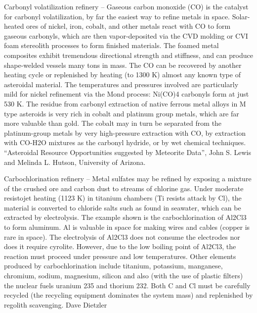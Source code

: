 \documentclass[a4paper]{book}
\begin{document}
Carbonyl volatilization refinery – Gaseous carbon monoxide (CO) is the catalyst for carbonyl volatilization, by far the easiest way to refine metals in space. Solar-heated ores of nickel, iron, cobalt, and other metals react with CO to form gaseous carbonyls, which are then vapor-deposited via the CVD molding or CVI foam stereolith processes to form finished materials. The foamed metal composites exhibit tremendous directional strength and stiffness, and can produce shape-welded vessels many tons in mass.  The CO can be recovered by another heating cycle or replenished by heating (to 1300 K) almost any known type of asteroidal material.  The temperatures and pressures involved are particularly mild for nickel refinement via the Mond process: Ni(CO)4 carbonyls form at just 530 K. The residue from carbonyl extraction of native ferrous metal alloys in M type asteroids is very rich in cobalt and platinum group metals, which are far more valuable than gold. The cobalt may in turn be separated from the platinum-group metals by very high-pressure extraction with CO, by extraction with CO-H2O mixtures as the carbonyl hydride, or by wet chemical techniques.   “Asteroidal Resource Opportunities suggested by Meteorite Data”,  John S. Lewis and Melinda L. Hutson, University of Arizona.
 
Carbochlorination refinery – Metal sulfates may be refined by exposing a mixture of the crushed ore and carbon dust to streams of chlorine gas. Under moderate resistojet heating (1123 K) in titanium chambers (Ti resists attack by Cl), the material is converted to chloride salts such as found in seawater, which can be extracted by electrolysis. The example shown is the carbochlorination of Al2Cl3 to form aluminum.  Al is valuable in space for making wires and cables (copper is rare in space).  The electrolysis of Al2Cl3 does not consume the electrodes nor does it require cyrolite. However, due to the low boiling point of Al2Cl3, the reaction must proceed under pressure and low temperatures.  Other elements produced by carbochlorination include titanium, potassium, manganese, chromium, sodium, magnesium, silicon and also (with the use of plastic filters) the nuclear fuels uranium 235 and thorium 232. Both C and Cl must be carefully recycled (the recycling equipment dominates the system mass) and replenished by regolith scavenging.  Dave Dietzler
 
\end{document}
